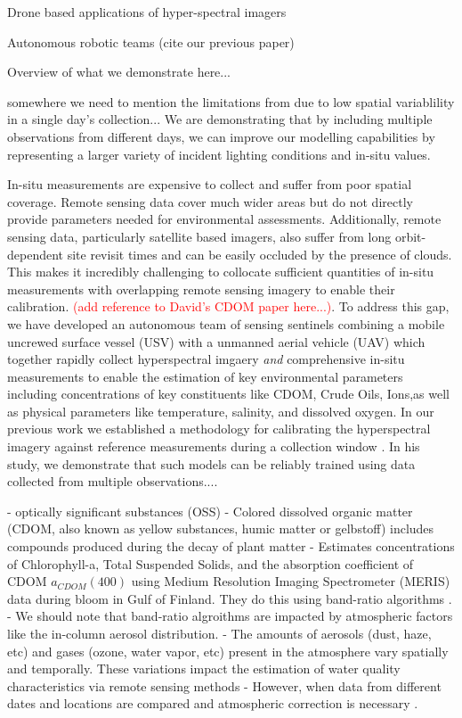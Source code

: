 \documentclass[journal,article,submit,pdftex,moreauthors]{Definitions/mdpi}
\begin{document}
Drone based applications of hyper-spectral imagers

Autonomous robotic teams (cite our previous paper) 

Overview of what we demonstrate here...

somewhere we need to mention the limitations from \cite{robotTeam1} due to low spatial variablility in a single day's collection... We are demonstrating that by including multiple observations from different days, we can improve our modelling capabilities by representing a larger variety of incident lighting conditions and in-situ values.

In-situ measurements are expensive to collect and suffer from poor spatial coverage. Remote sensing data cover much wider areas but do not directly provide parameters needed for environmental assessments. Additionally, remote sensing data, particularly satellite based imagers, also suffer from long orbit-dependent site revisit times and can be easily occluded by the presence of clouds. This makes it incredibly challenging to collocate sufficient quantities of in-situ measurements with overlapping remote sensing imagery to enable their calibration. \textcolor{red}{(add reference to David's CDOM paper here...)}. To address this gap, we have developed an autonomous team of sensing sentinels combining a mobile uncrewed surface vessel (USV) with a unmanned aerial vehicle (UAV) which together rapidly collect hyperspectral imgaery \textit{and} comprehensive in-situ measurements to enable the estimation of key environmental parameters including concentrations of key constituents like CDOM, Crude Oils, Ions,as well as physical parameters like temperature, salinity, and dissolved oxygen. In our previous work we established a methodology for calibrating the hyperspectral imagery against reference measurements during a collection window \cite{robotTeam1}. In his study, we demonstrate that such models can be reliably trained using data collected from multiple observations....  



- optically significant substances (OSS)
- Colored dissolved organic matter (CDOM, also known as yellow substances, humic matter or gelbstoff) includes compounds produced during the decay of plant matter
- Estimates concentrations of Chlorophyll-a, Total Suspended Solids, and the absorption coefficient of CDOM $a_{CDOM}(400)$ using Medium Resolution Imaging Spectrometer (MERIS) data during bloom in Gulf of Finland. They do this using band-ratio algorithms \cite{remote-sensing-finland}.
-  We should note that band-ratio algroithms are impacted by atmospheric factors like the in-column aerosol distribution.
- The amounts of aerosols (dust, haze, etc) and gases (ozone, water vapor, etc) present in the atmosphere vary spatially and temporally. These variations impact the estimation of water quality characteristics via remote sensing methods \cite{remote-sensing-finland}
- However, when data from different dates and locations are compared and atmospheric correction is necessary \cite{remote-sensing-finland}.
\end{document}
